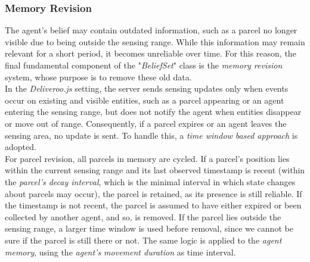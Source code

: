         \subsubsection{Memory Revision}\label{memoryRevision}
            The agent's belief may contain outdated information, such as a parcel no longer visible due to being outside the sensing range. While this information may remain relevant for a short period, it becomes unreliable over time. For this reason, the final fundamental component of the "\textit{BeliefSet}" class is the \textit{memory revision} system, whose purpose is to remove these old data.
            \medskip\\
            In the \textit{Deliveroo.js} setting, the server sends sensing updates only when events occur on existing and visible entities, such as a parcel appearing or an agent entering the sensing range, but does not notify the agent when entities disappear or move out of range. Consequently, if a parcel expires or an agent leaves the sensing area, no update is sent. To handle this, a \textit{time window based approach} is adopted.
            \medskip\\
            For parcel revision, all parcels in memory are cycled. If a parcel's position lies within the current sensing range and its last observed timestamp is recent (within the \textit{parcel's decay interval}, which is the minimal interval in which state changes about parcels may occur), the parcel is retained, as its presence is still reliable. If the timestamp is not recent, the parcel is assumed to have either expired or been collected by another agent, and so, is removed. If the parcel lies outside the sensing range, a larger time window is used before removal, since we cannot be sure if the parcel is still there or not. The same logic is applied to the \textit{agent memory}, using the \textit{agent's movement duration} as time interval.

